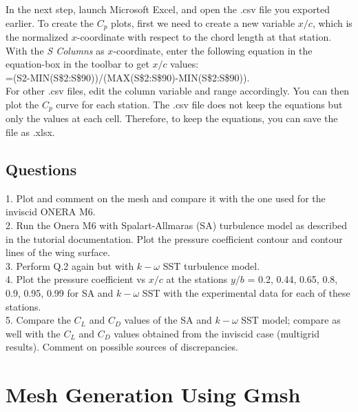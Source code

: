 In the next step, launch Microsoft Excel, and open the .csv file you exported earlier. To create the $C_p$ plots, first we need to create a new
variable $x/c$, which is the normalized $x$-coordinate with respect to the chord length at that station. With the \textit{S Columns} as $x$-coordinate, enter the following equation in the equation-box in the toolbar to get $x/c$ values: \\
=(S2-MIN(S\$2:S\$90))/(MAX(S\$2:S\$90)-MIN(S\$2:S\$90)). \\
For other .csv files, edit the column variable and range accordingly. You can then plot the $C_p$ curve for each station. The .csv file does not keep the equations but only the values at each cell. Therefore, to keep the equations, you can save the file as .xlsx.

\section{Questions}
1. Plot and comment on the mesh and compare it with the one used for the inviscid ONERA M6. \\
2. Run the Onera M6 with Spalart-Allmaras (SA) turbulence model as described in the tutorial documentation. Plot the pressure coefficient contour and contour lines of the wing surface. \\
3. Perform Q.2 again but with $k-\omega$ SST turbulence model. \\
4. Plot the pressure coefficient vs $x/c$ at the stations $y/b$ = 0.2, 0.44, 0.65, 0.8, 0.9, 0.95, 0.99 for SA and $k-\omega$ SST with the
experimental data \cite{schmitt1979pressure} for each of these stations. \\
5. Compare the $C_L$ and $C_D$ values of the SA and $k-\omega$ SST model; compare as well with the $C_L$ and $C_D$ values obtained from
the inviscid case (multigrid results). Comment on possible sources of discrepancies.
\chapter{Mesh Generation Using Gmsh}
\label{ch:Mesh Generation Unisg Gmsh}

